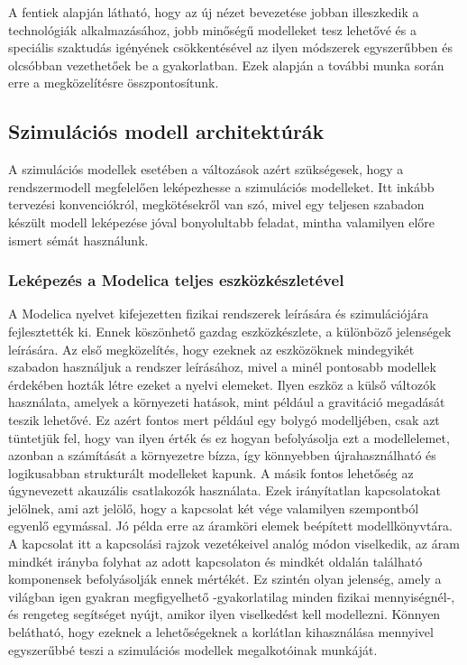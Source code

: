         A fentiek alapján látható, hogy az új nézet bevezetése jobban illeszkedik a technológiák alkalmazásához, jobb minőségű modelleket tesz lehetővé és a speciális szaktudás igényének csökkentésével az ilyen módszerek egyszerűbben és olcsóbban vezethetőek be a gyakorlatban.
        Ezek alapján a további munka során erre a megközelítésre összpontosítunk.

    \subsection{Szimulációs modell architektúrák}
    A szimulációs modellek esetében a változások azért szükségesek, hogy a rendszermodell megfelelően leképezhesse a szimulációs modelleket.
    Itt inkább tervezési konvenciókról, megkötésekről van szó, mivel egy teljesen szabadon készült modell leképezése jóval bonyolultabb feladat, mintha valamilyen előre ismert sémát használunk.

        \subsubsection{Leképezés a Modelica teljes eszközkészletével}
        A Modelica nyelvet kifejezetten fizikai rendszerek leírására és szimulációjára fejlesztették ki.
        Ennek köszönhető gazdag eszközkészlete, a különböző jelenségek leírására.
        Az első megközelítés, hogy ezeknek az eszközöknek mindegyikét szabadon használjuk a rendszer leírásához, mivel a minél pontosabb modellek érdekében hozták létre ezeket a nyelvi elemeket.
        Ilyen eszköz a külső változók használata, amelyek a környezeti hatások, mint például a gravitáció megadását teszik lehetővé. Ez azért fontos mert például egy bolygó modelljében, csak azt tüntetjük fel, hogy van ilyen érték és ez hogyan befolyásolja ezt a modellelemet, azonban a számítását a környezetre bízza, így könnyebben újrahasználható és logikusabban strukturált modelleket kapunk.
        A másik fontos lehetőség az úgynevezett akauzális csatlakozók használata. Ezek irányítatlan kapcsolatokat jelölnek, ami azt jelölő, hogy a kapcsolat két vége valamilyen szempontból egyenlő egymással. Jó példa erre az áramköri elemek beépített modellkönyvtára. A kapcsolat itt a kapcsolási rajzok vezetékeivel analóg módon viselkedik, az áram mindkét irányba folyhat az adott kapcsolaton és mindkét oldalán található komponensek befolyásolják ennek mértékét.
        Ez szintén olyan jelenség, amely a világban igen gyakran megfigyelhető -gyakorlatilag minden fizikai mennyiségnél-, és rengeteg segítséget nyújt, amikor ilyen viselkedést kell modellezni.
        Könnyen belátható, hogy ezeknek a lehetőségeknek a korlátlan kihasználása mennyivel egyszerűbbé teszi a szimulációs modellek megalkotóinak munkáját.

